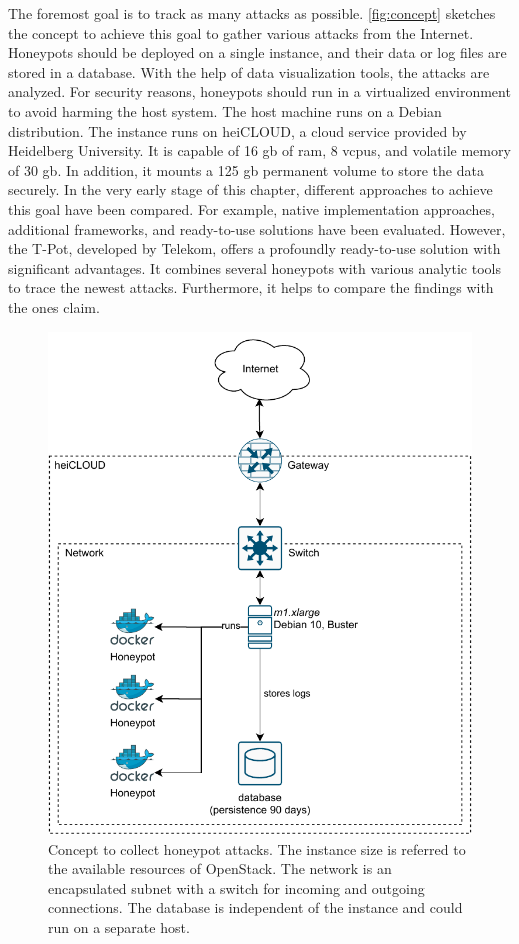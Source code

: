 The foremost goal is to track as many attacks as possible.
\autoref{fig:concept} sketches the concept to achieve this goal to gather various attacks from the Internet.
Honeypots should be deployed on a single instance, and their data or log files are stored in a database.
With the help of data visualization tools, the attacks are analyzed.
For security reasons, honeypots should run in a virtualized environment to avoid harming the host system.
The host machine runs on a Debian distribution.
The instance runs on heiCLOUD, a cloud service provided by Heidelberg University.
It is capable of 16 \ac{gb} of \ac{ram}, 8 \acp{vcpu}, and volatile memory of 30 \ac{gb}.
In addition, it mounts a 125 \ac{gb} permanent volume to store the data securely.
In the very early stage of this chapter, different approaches to achieve this goal have been compared.
For example, native implementation approaches, additional frameworks, and ready-to-use solutions have been evaluated.
However, the T-Pot, developed by Telekom, offers a profoundly ready-to-use solution with significant advantages.
It combines several honeypots with various analytic tools to trace the newest attacks.
Furthermore, it helps to compare the findings with the ones \citet{Kelly2021} claim.

\begin{figure}
    \centering
    \includegraphics{figures/tpot-concept.pdf}
    \caption[Concept to collect honeypot attacks]{
        Concept to collect honeypot attacks.
        The instance size is referred to the available resources of OpenStack.
        The network is an encapsulated subnet with a switch for incoming and outgoing connections.
        The database is independent of the instance and could run on a separate host.
    }
    \label{fig:concept}
\end{figure}


